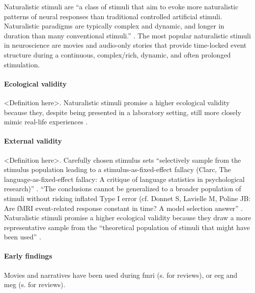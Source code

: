
Naturalistic stimuli are ``a class of stimuli that aim to evoke more
naturalistic patterns of neural responses than traditional controlled artificial
stimuli. Naturalistic paradigms are typically complex and dynamic, and longer in
duration than many conventional stimuli.'' \citep{vanderwal2019movies}.
The most popular naturalistic stimuli in neuroscience are movies and audio-only
stories that provide time-locked event structure during a continuous,
complex/rich, dynamic, and often prolonged stimulation.


\paragraph{Ecological validity}
<Definition here>.
Naturalistic stimuli promise a higher ecological validity because they, despite
being presented in a laboratory setting, still more closely mimic real-life
experiences \citep{hasson2004intersubject}.


\paragraph{External validity}
<Definition here>.
Carefully chosen stimulus sets ``selectively sample from the stimulus population
leading to a stimulus-as-fixed-effect fallacy (Clarc, The
language-as-fixed-effect fallacy: A critique of language statistics in
psychological research)'' \citep{westfall2016fixing}.
%
``The conclusions cannot be generalized to a broader population of stimuli
without risking inflated Type I error  (cf. Donnet S, Lavielle M, Poline JB: Are
fMRI event-related response constant in time? A model selection
answer'' \citep{westfall2016fixing}.
%
Naturalistic stimuli promise a higher ecological validity because they draw a
more representative sample from the ``theoretical population of stimuli that
might have been used'' \citep{westfall2016fixing}.



\paragraph{Early findings}
%

Movies and narratives have been used during \ac{fmri}
(s.\citet{hamilton2018revolution, hasson2008neurocinematics,
jaaskelainen2021movies, sonkusare2019naturalistic, saarimaki2021naturalistic}
for reviews), or \ac{eeg} and \ac{meg} (s. \citet{alday2019meg,
kandylaki2019story} for reviews).

